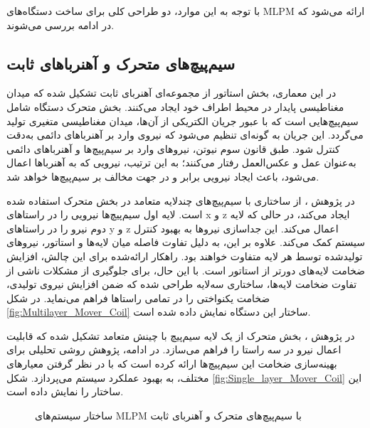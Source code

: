 با توجه به این موارد، دو طراحی کلی برای ساخت دستگاه‌های MLPM ارائه می‌شود که در ادامه بررسی می‌‌شوند.
\subsection{سیم‌پیچ‌های متحرک و آهنرباهای ثابت}

در این معماری، بخش استاتور از مجموعه‌ای آهنربای ثابت تشکیل شده که میدان مغناطیسی پایدار در محیط اطراف خود ایجاد می‌کنند. بخش متحرک دستگاه شامل سیم‌پیچ‌هایی است که با عبور جریان الکتریکی از آن‌ها، میدان مغناطیسی متغیری تولید می‌گردد. این جریان به گونه‌ای تنظیم می‌شود که نیروی وارد بر آهنرباهای دائمی به‌دقت کنترل شود. طبق قانون سوم نیوتن، نیروهای وارد بر سیم‌پیچ‌ها و آهنرباهای دائمی به‌عنوان عمل و عکس‌العمل رفتار می‌کنند؛ به این ترتیب، نیرویی که به آهنرباها اعمال می‌شود، باعث ایجاد نیرویی برابر و در جهت مخالف بر سیم‌پیچ‌ها خواهد شد.

در پژوهش 
\cite{RN49}
، از ساختاری با سیم‌پیچ‌های چندلایه متعامد در بخش متحرک استفاده شده است. لایه اول سیم‌پیچ‌ها نیرویی را در راستاهای x و z ایجاد می‌کند، در حالی که لایه دوم نیرو را در راستاهای y و z اعمال می‌کند. این جداسازی نیروها به بهبود کنترل سیستم کمک می‌کند. علاوه بر این، به دلیل تفاوت فاصله میان لایه‌ها و استاتور، نیروهای تولیدشده توسط هر لایه متفاوت خواهند بود. راهکار ارائه‌شده برای این چالش، افزایش ضخامت لایه‌های دورتر از استاتور است. با این حال، برای جلوگیری از مشکلات ناشی از تفاوت ضخامت لایه‌ها، ساختاری سه‌لایه طراحی شده که ضمن افزایش نیروی تولیدی، ضخامت یکنواختی را در تمامی راستاها فراهم می‌نماید. در شکل 
\ref{fig:Multilayer_Mover_Coil}
ساختار این دستگاه نمایش داده شده است.

در پژوهش 
\cite{RN38}
، بخش متحرک از یک لایه سیم‌پیچ با چینش متعامد تشکیل شده که قابلیت اعمال نیرو در سه راستا را فراهم می‌سازد. در ادامه، پژوهش
\cite{RN14}
 روشی تحلیلی برای بهینه‌سازی ضخامت این سیم‌پیچ‌ها ارائه کرده است که با در نظر گرفتن معیارهای مختلف، به بهبود عملکرد سیستم می‌پردازد. شکل 
\ref{fig:Single_layer_Mover_Coil}
 این ساختار را نمایش داده است.

\begin{figure}[ht]
\centering 
{}
%
\caption{ساختار سیستم‌های MLPM با سیم‌پیچ‌های متحرک و آهنربای ثابت}
\label{fig:Moveing_Coil} %
\end{figure}

